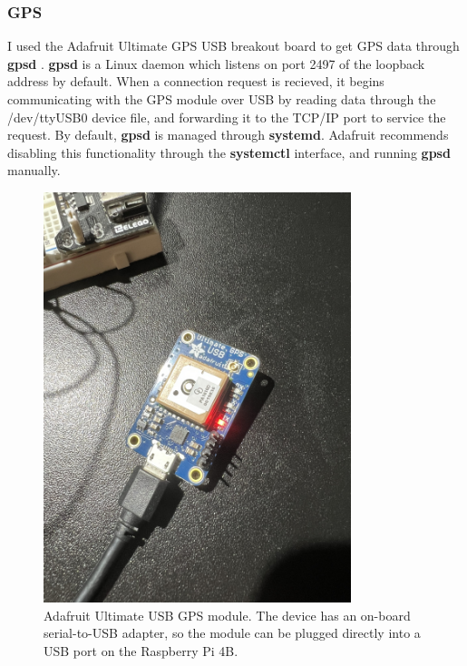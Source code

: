 \documentclass[12pt]{article}
\begin{document}
\subsubsection{GPS}
	
	I used the Adafruit Ultimate GPS USB breakout board to get GPS data through \textbf{gpsd} \cite{townsend2023}. \textbf{gpsd} is a Linux daemon which listens on port 2497 of the loopback address by default. When a connection request is recieved, it begins communicating with the GPS module over USB by reading data through the /dev/ttyUSB0 device file, and forwarding it to the TCP/IP port to service the request. By default, \textbf{gpsd} is managed through \textbf{systemd}. Adafruit recommends disabling this functionality through the \textbf{systemctl} interface, and running \textbf{gpsd} manually.

\begin{figure}[h]
\centering
\includegraphics[width=0.8\textwidth]{gps_hardware.jpg} %
\caption{Adafruit Ultimate USB GPS module. The device has an on-board serial-to-USB adapter, so the module can be plugged directly into a USB port on the Raspberry Pi 4B.}
\label{fig:gps_hardware}
\end{figure}
	
\end{document}
